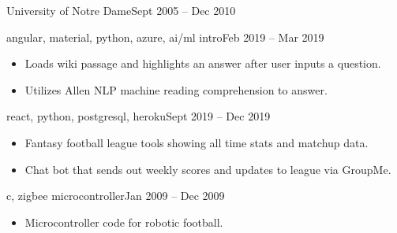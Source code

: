  {University of Notre Dame}{Sept 2005 -- Dec 2010 \hspace{1 cm}}{}

\smallskip
{}

\smallskip
{}
{\MakeLowercase{Angular, Material, Python, Azure, AI/ML Intro}}{Feb 2019 -- Mar 2019}{}
\begin{itemize}
\item Loads wiki passage and highlights an answer after user inputs a question.
\item Utilizes Allen NLP machine reading comprehension to answer.
\end{itemize}

\divider

{\MakeLowercase{react, python, postgresql, heroku}}{Sept 2019 -- Dec 2019}{}
\begin{itemize}
\item  Fantasy football league tools showing all time stats and matchup data.
\item  Chat bot that sends out weekly scores and updates to league via GroupMe.
\end{itemize}

\divider

{\MakeLowercase{C, ZigBee Microcontroller}}{Jan 2009 -- Dec 2009}{}
\begin{itemize}
\item  Microcontroller code for robotic football.
\end{itemize}

